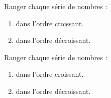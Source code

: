 \begin{exercice}
    Ranger chaque série de nombres :
    \begin{enumerate}
       \item dans l'ordre croissant. \\ [1mm]
           \;  \;  \;  \;  \;  \smallskip
       \item dans l'ordre décroissant. \\ [1mm]
           \;  \;  \;  \;  \;  \; 
    \end{enumerate}
 \end{exercice}

 \begin{corrige}
    Ranger chaque série de nombres :

    \begin{enumerate}
       \item dans l'ordre croissant. \\ [1mm]
           \;  \;  \;  \;  \;  \smallskip

          {\red {} \;  \;  \;  \;  \;  \smallskip}
       \item dans l'ordre décroissant. \\ [1mm]
           \;  \;  \;  \;  \;  \;  \smallskip

          {\red {} \;  \;  \;  \;  \;  \; }
    \end{enumerate}
 \end{corrige}